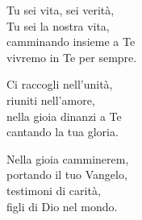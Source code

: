 
 

\spazio

\strofa Tu sei vita, sei verità,\\
Tu sei la nostra vita,\\
camminando insieme a Te\\
vivremo in Te per sempre.

\spazio

 

\spazio

\strofa Ci raccogli nell'unità,\\
riuniti nell'amore,\\
nella gioia dinanzi a Te\\
cantando la tua gloria.

\spazio

 

\spazio

\strofa Nella gioia camminerem,\\
portando il tuo Vangelo,\\
testimoni di carità,\\
figli di Dio nel mondo.

\spazio

 